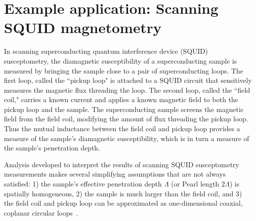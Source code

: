 \documentclass[final,3p,times]{elsarticle}
\newcommand{\inline}[1]{\texttt{#1}\xspace}
\begin{document}
\section{Example application: Scanning SQUID magnetometry}
\label{section:application}
In scanning superconducting quantum interference device (SQUID) susceptometry, the diamagnetic susceptibility of a superconducting sample is measured by bringing the sample close to a pair of superconducting loops. The first loop, called the ``pickup loop" is attached to a SQUID circuit that sensitively measures the magnetic flux threading the loop. The second loop, called the ``field coil," carries a known current and applies a known magnetic field to both the pickup loop and the sample. The superconducting sample screens the magnetic field from the field coil, modifying the amount of flux threading the pickup loop. Thus the mutual inductance between the field coil and pickup loop provides a measure of the sample's diamagnetic susceptibility, which is in turn a measure of the sample's penetration depth.

Analysis developed to interpret the results of scanning SQUID susceptometry measurements makes several simplifying assumptions that are not always satisfied: 1) the sample's effective penetration depth $\Lambda$ (or Pearl length $2\Lambda$) is spatially homogeneous, 2) the sample is much larger than the field coil, and 3) the field coil and pickup loop can be approximated as one-dimensional coaxial, coplanar circular loops~\cite{Kirtley_Kalisky_2012}.

\end{document}
